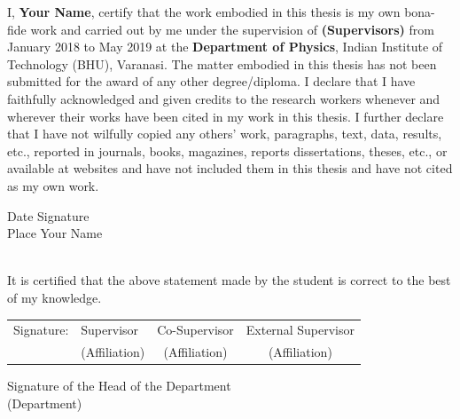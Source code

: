 
\begin{declaration}
	
	I, \textbf{Your Name}, certify that the work embodied in this thesis is my own bona-fide work and carried out by me under the supervision of \textbf{(Supervisors)} from January 2018 to May 2019 at the \textbf{Department of Physics}, Indian Institute of Technology (BHU), Varanasi. The matter embodied in this thesis has not been submitted for the award of any other degree/diploma. I declare that I have faithfully acknowledged and given credits to the research workers whenever and wherever their works have been cited in my work in this thesis. I further declare that I have not wilfully copied any others' work, paragraphs, text, data, results, etc., reported in journals, books, magazines, reports dissertations, theses, etc., or available at websites and have not included them in this thesis and have not cited as my own work.\\
	\flushleft
	
	
	
	Date   \hspace{5.1cm}  Signature      \\
	Place \hspace{5cm} Your Name \\
	
	\vfill
	
	 \\
	\flushleft
	It is certified that the above statement made by the student is correct to the best of my knowledge. \\
	\vspace*{0.6cm}
	
	
	\begin{table}[htbp]
		{ \bfseries
			\begin{tabular}{llcc}
				Signature: \hspace{0.5cm} & Supervisor            \hspace{1cm}        & Co-Supervisor   \hspace{1cm}  &  External Supervisor   \\
				\hspace{0.5cm}  & (Affiliation)             \hspace{1cm}       &  (Affiliation)        \hspace{1cm}       &  (Affiliation)     
			\end{tabular} 
		}
	\end{table}
	\vfill \centering Signature of the Head of the Department \\ (Department)
	
\end{declaration}

